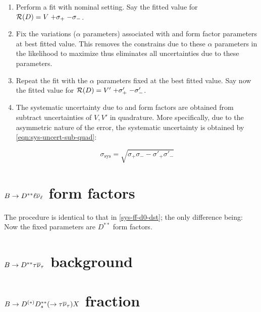 \begin{enumerate}
    \item Perform a fit with nominal setting. Say the fitted value for
        $\mathcal{R}(D) = V\;{+\sigma_+}\;{-\sigma_-}$.
    \item Fix the variations ($\alpha$ parameters) associated with \Dz and
        \Dstar form factor parameters at best fitted value.
        This removes the constrains due to these $\alpha$ parameters in the
        likelihood to maximize thus
        eliminates all uncertainties due to these parameters.
    \item Repeat the fit with the $\alpha$ parameters fixed at the best fitted
        value.
        Say now the fitted value for
        $\mathcal{R}(D) = V'\;{+\sigma'_+}\;{-\sigma'_-}$.
    \item The systematic uncertainty due to \Dz and \Dstar form factors are
        obtained from subtract uncertainties of $V, V'$ in quadrature.
        More specifically, due to the asymmetric nature of the error,
        the systematic uncertainty is obtained by
        \cref{eqn:sys-uncert-sub-quad}:

        \begin{equation}
            \sigma_\text{sys} = \sqrt{\sigma_+ \sigma_- - \sigma'_+ \sigma'_-}
            \label{eqn:sys-uncert-sub-quad}
        \end{equation}
\end{enumerate}


\section{$B \rightarrow D^{**}\ell{\ensuremath{{\overline{\nu}}_\ell}}$ form factors}
\label{sys-ff-dstst}

The procedure is identical to that in \cref{sys-ff-d0-dst}; the only difference
being: Now the fixed parameters are $D^{**}$ form factors.


\section{$B \rightarrow D^{**}\tau{\ensuremath{{\overline{\nu}}_\tau}}$ background}
\label{sys-tau-dstst}


\section{$B \rightarrow D^{(*)} D^{**}_s (\rightarrow \tau{\ensuremath{{\overline{\nu}}_\tau}}) X$ fraction}
\label{sys-tau-ddx}


